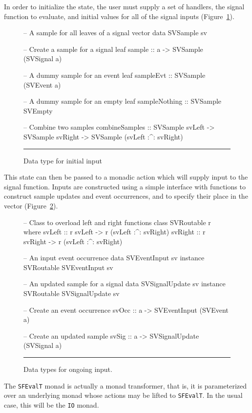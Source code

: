 In order to initialize the state, the user must supply a set of handlers, the
signal function to evaluate, and initial values for all of the signal inputs
(Figure~\ref{figure:initial_input}).

\begin{figure}
\begin{code}
-- A sample for all leaves of a signal vector
data SVSample sv

-- Create a sample for a signal leaf
sample          :: a -> SVSample (SVSignal a)

-- A dummy sample for an event leaf
sampleEvt       :: SVSample (SVEvent a)

-- A dummy sample for an empty leaf
sampleNothing   :: SVSample SVEmpty

-- Combine two samples
combineSamples  ::    SVSample svLeft
                   -> SVSample svRight
                   -> SVSample (svLeft :^: svRight)
\end{code}
\hrule
\caption{Data type for initial input}
\label{figure:initial_input}
\end{figure}

This state can then be passed to a monadic action which will supply input to
the signal function. Inputs are constructed using a simple interface with
functions to construct sample updates and event occurrences, and to specify
their place in the vector (Figure~\ref{figure:ongoing_input}).

\begin{figure}
\begin{code}
-- Class to overload left and right functions
class SVRoutable r where
  svLeft          :: r svLeft -> r (svLeft :^: svRight)
  svRight         :: r svRight -> r (svLeft :^: svRight)

-- An input event occurrence
data SVEventInput sv
instance SVRoutable SVEventInput sv

-- An updated sample for a signal
data SVSignalUpdate sv
instance SVRoutable SVSignalUpdate sv

-- Create an event occurrence
svOcc           :: a -> SVEventInput (SVEvent a)

-- Create an updated sample
svSig           :: a -> SVSignalUpdate (SVSignal a)
\end{code}
\hrule
\caption{Data types for ongoing input.}
\label{figure:ongoing_input}
\end{figure}

The {\tt SFEvalT} monad is actually a monad transformer, that is, it is
parameterized over an underlying monad whose actions may be lifted to
{\tt SFEvalT}. In the usual case, this will be the {\tt IO} monad.

